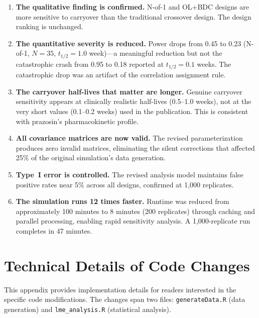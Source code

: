 \documentclass[11pt]{article}
\begin{document}
\begin{enumerate}
\item \textbf{The qualitative finding is confirmed.} N-of-1
  and OL+BDC designs are more sensitive to carryover than the
  traditional crossover design. The design ranking is
  unchanged.

\item \textbf{The quantitative severity is reduced.} Power
  drops from 0.45 to 0.23 (N-of-1, $N = 35$, $t_{1/2} = 1.0$
  week)---a meaningful reduction but not the catastrophic
  crash from 0.95 to 0.18 reported at $t_{1/2} = 0.1$ weeks.
  The catastrophic drop was an artifact of the correlation
  assignment rule.

\item \textbf{The carryover half-lives that matter are longer.}
  Genuine carryover sensitivity appears at clinically realistic
  half-lives (0.5--1.0 weeks), not at the very short values
  (0.1--0.2 weeks) used in the publication. This is consistent
  with prazosin's pharmacokinetic profile.

\item \textbf{All covariance matrices are now valid.} The
  revised parameterization produces zero invalid matrices,
  eliminating the silent corrections that affected 25\% of the
  original simulation's data generation.

\item \textbf{Type~I error is controlled.} The revised
  analysis model maintains false positive rates near 5\%
  across all designs, confirmed at 1,000 replicates.

\item \textbf{The simulation runs 12 times faster.} Runtime
  was reduced from approximately 100 minutes to 8 minutes
  (200 replicates) through caching and parallel processing,
  enabling rapid sensitivity analysis. A 1,000-replicate run
  completes in 47 minutes.
\end{enumerate}

\appendix
\section{Technical Details of Code Changes}

This appendix provides implementation details for readers
interested in the specific code modifications. The changes
span two files: \texttt{generateData.R} (data generation)
and \texttt{lme\_analysis.R} (statistical analysis).
\end{document}
